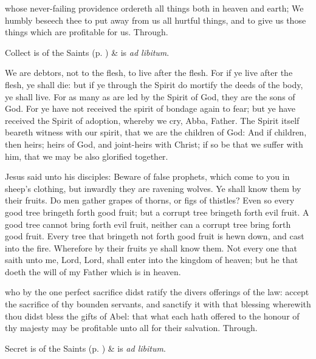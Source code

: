 \collect
{} whose never-failing providence ordereth all things both in heaven and earth; We humbly beseech thee to put away from us all hurtful things, and to give us those things which are profitable for us. Through.
\begin{rubric}
     Collect is of the Saints (p. \pageref{SPSaints}) \&  is \emph{ad libitum}.
\end{rubric}

 We are debtors, not to the flesh, to live after the flesh. For if ye live after the flesh, ye shall die: but if ye through the Spirit do mortify the deeds of the body, ye shall live. For as many as are led by the Spirit of God, they are the sons of God. For ye have not received the spirit of bondage again to fear; but ye have received the Spirit of adoption, whereby we cry, Abba, Father. The Spirit itself beareth witness with our spirit, that we are the children of God: And if children, then heirs; heirs of God, and joint-heirs with Christ; if so be that we suffer with him, that we may be also glorified together.



 Jesus said unto his disciples: Beware of false prophets, which come to you in sheep's clothing, but inwardly they are ravening wolves. Ye shall know them by their fruits. Do men gather grapes of thorns, or figs of thistles? Even so every good tree bringeth forth good fruit; but a corrupt tree bringeth forth evil fruit. A good tree cannot bring forth evil fruit, neither can a corrupt tree bring forth good fruit. Every tree that bringeth not forth good fruit is hewn down, and cast into the fire. Wherefore by their fruits ye shall know them. Not every one that saith unto me, Lord, Lord, shall enter into the kingdom of heaven; but he that doeth the will of my Father which is in heaven.


\secret
{} who by the one perfect sacrifice didst ratify the divers offerings of the law: accept the sacrifice of thy bounden servants, and sanctify it with that blessing wherewith thou didst bless the gifts of Abel: that what each hath offered to the honour of thy majesty may be profitable unto all for their salvation. Through.
\begin{rubric}
     Secret is of the Saints (p. \pageref{SPSaints}) \&  is \emph{ad libitum}.
\end{rubric}

